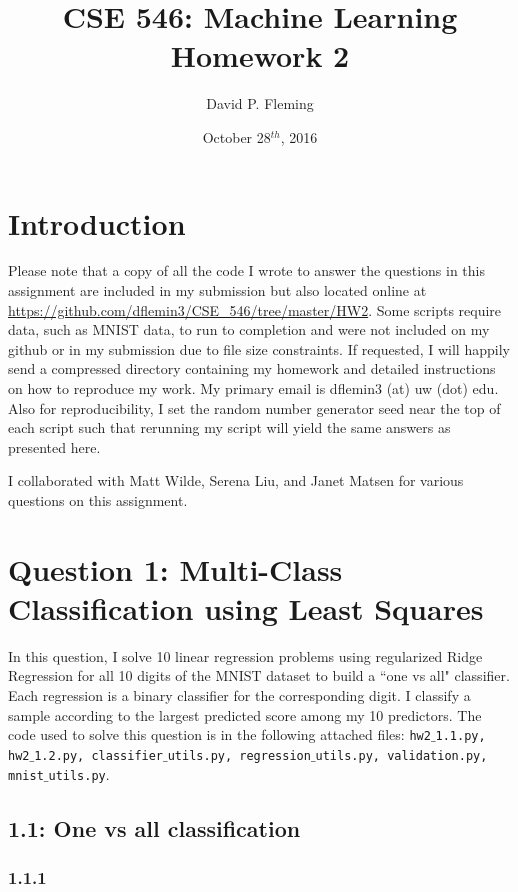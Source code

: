 \documentclass[12pt]{amsart}
\title{CSE 546: Machine Learning Homework 2}
\author{David P. Fleming}
\date{October 28$^{th}$, 2016}
\begin{document}
\maketitle
\tableofcontents

\section*{Introduction}

Please note that a copy of all the code I wrote to answer the questions in this assignment are included in my submission but also located online at \url{https://github.com/dflemin3/CSE_546/tree/master/HW2}.  Some scripts require data, such as MNIST data, to run to completion and were not included on my github or in my submission due to file size constraints.  If requested, I will happily send a compressed directory containing my homework and detailed instructions on how to reproduce my work.  My primary email is dflemin3 (at) uw (dot) edu.  Also for reproducibility, I set the random number generator seed near the top of each script such that rerunning my script will yield the same answers as presented here.


I collaborated with Matt Wilde, Serena Liu, and Janet Matsen for various questions on this assignment.


\section*{Question 1: Multi-Class Classification using Least Squares}

In this question, I solve 10 linear regression problems using regularized Ridge Regression for all 10 digits of the MNIST dataset to build a ``one vs all" classifier.  Each regression is a binary classifier for the corresponding digit.  I classify a sample according to the largest predicted score among my 10 predictors.  The code used to solve this question is in the following attached files: {\tt hw2$\_$1.1.py, hw2$\_$1.2.py, classifier$\_$utils.py, regression$\_$utils.py, validation.py, mnist$\_$utils.py}.

\subsection*{1.1: One vs all classification}

\subsubsection*{1.1.1}
\end{document}
